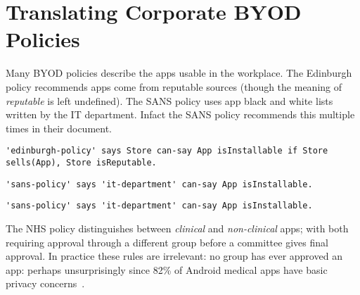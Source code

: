\documentclass{easychair}
\begin{document}
\section{Translating Corporate BYOD Policies}
\label{sec:translation}

Many BYOD policies describe the apps usable in the workplace.
The Edinburgh policy recommends apps come from reputable sources (though the meaning of \emph{reputable} is left undefined). 
The SANS policy uses app black and white lists written by the IT department.
Infact the SANS policy recommends this multiple times in their document.
\begin{lstlisting}[title={\footnotesize\textbf{Edinburgh}:~\itshape ``Only download applications (‘apps’) or other software from reputable sources.''}]
'edinburgh-policy' says Store can-say App isInstallable if Store sells(App), Store isReputable.
\end{lstlisting}
\begin{lstlisting}[title={\footnotesize\textbf{SANS}:~\itshape ``The IT Department maintains a list of allowed and unauthorized applications and makes them available to users on the intranet.''}]
'sans-policy' says 'it-department' can-say App isInstallable.
\end{lstlisting}
\begin{lstlisting}[title={\footnotesize\textbf{SANS}:~\itshape ``Only approved third party applications can be
installed on handhelds. The approved list can be
obtained by contacting the IT department, or should be
available on the intranet.''}]
'sans-policy' says 'it-department' can-say App isInstallable.
\end{lstlisting}
The NHS policy distinguishes between \emph{clinical} and \emph{non-clinical} apps;
    with both requiring approval through a different group before a committee gives final approval.
In practice these rules are irrelevant: no group has ever approved an app: perhaps unsurprisingly since 82\% of Android medical apps have basic privacy concerns~\cite{Blenner:2016ja}.
\end{document}
